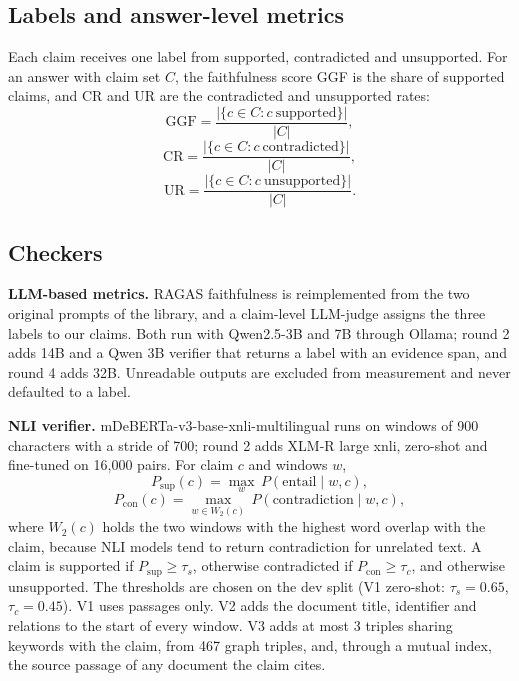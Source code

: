 \documentclass[conference]{IEEEtran}
\begin{document}
\subsection{Labels and answer-level metrics}
Each claim receives one label from supported, contradicted and unsupported. For an answer with claim set $C$, the faithfulness score GGF is the share of supported claims, and CR and UR are the contradicted and unsupported rates:
\begin{equation}
\mathrm{GGF}=\frac{|\{c\in C: c\ \text{supported}\}|}{|C|},
\end{equation}
\begin{equation}
\mathrm{CR}=\frac{|\{c\in C: c\ \text{contradicted}\}|}{|C|},
\end{equation}
\begin{equation}
\mathrm{UR}=\frac{|\{c\in C: c\ \text{unsupported}\}|}{|C|}.
\end{equation}

\subsection{Checkers}
\textbf{LLM-based metrics.} RAGAS faithfulness is reimplemented from the two original prompts of the library, and a claim-level LLM-judge assigns the three labels to our claims. Both run with Qwen2.5-3B and 7B through Ollama; round 2 adds 14B and a Qwen 3B verifier that returns a label with an evidence span, and round 4 adds 32B. Unreadable outputs are excluded from measurement and never defaulted to a label.

\textbf{NLI verifier.} mDeBERTa-v3-base-xnli-multilingual \cite{deberta,mdeberta} runs on windows of 900 characters with a stride of 700; round 2 adds XLM-R large xnli, zero-shot and fine-tuned on 16,000 pairs. For claim $c$ and windows $w$,
\begin{equation}
P_{\mathrm{sup}}(c)=\max_{w}\,P(\mathrm{entail}\mid w,c),
\end{equation}
\begin{equation}
P_{\mathrm{con}}(c)=\max_{w\in W_2(c)}\,P(\mathrm{contradiction}\mid w,c),
\end{equation}
where $W_2(c)$ holds the two windows with the highest word overlap with the claim, because NLI models tend to return contradiction for unrelated text. A claim is supported if $P_{\mathrm{sup}}\ge\tau_s$, otherwise contradicted if $P_{\mathrm{con}}\ge\tau_c$, and otherwise unsupported. The thresholds are chosen on the dev split (V1 zero-shot: $\tau_s=0.65$, $\tau_c=0.45$). V1 uses passages only. V2 adds the document title, identifier and relations to the start of every window. V3 adds at most 3 triples sharing keywords with the claim, from 467 graph triples, and, through a mutual index, the source passage of any document the claim cites.
\end{document}
